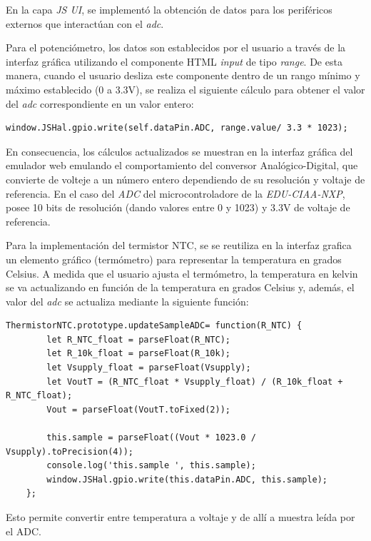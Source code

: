 En la capa \textit{JS UI}, se implementó la obtención de datos para los periféricos externos que interactúan con el \textit{adc}. 

Para el potenciómetro, los datos son establecidos por el usuario a través de la interfaz gráfica utilizando el componente HTML  \textit{input} de tipo \textit{range}. De esta manera, cuando el usuario desliza este componente dentro de un rango mínimo y máximo establecido (0 a 3.3V), se realiza el siguiente cálculo para obtener el valor del \textit{adc} correspondiente en un valor entero:

\begin{lstlisting}[caption={Cálculo del ADC para el potenciómetro.}]
  window.JSHal.gpio.write(self.dataPin.ADC, range.value/ 3.3 * 1023);
\end{lstlisting}

En consecuencia, los cálculos actualizados se muestran en la interfaz gráfica del emulador web emulando el comportamiento del conversor Analógico-Digital, que convierte de volteje a un número entero dependiendo de su resolución y voltaje de referencia. En el caso del \textit{ADC} del microcontroladore de la \textit{EDU-CIAA-NXP}, posee 10 bits de resolución (dando valores entre 0 y 1023) y 3.3V de voltaje de referencia.

Para la implementación del termistor NTC, se se reutiliza en la interfaz grafica un elemento gráfico (termómetro) para representar la temperatura en grados Celsius. A medida que el usuario ajusta el termómetro, la temperatura en kelvin se va actualizando en función de la temperatura en grados Celsius y, además, el valor del \textit{adc} se actualiza mediante la siguiente función:

\begin{lstlisting}[caption={Cálculo ADC del termistor NTC.}]
     ThermistorNTC.prototype.updateSampleADC= function(R_NTC) {
        let R_NTC_float = parseFloat(R_NTC);
        let R_10k_float = parseFloat(R_10k);
        let Vsupply_float = parseFloat(Vsupply);    
        let VoutT = (R_NTC_float * Vsupply_float) / (R_10k_float + R_NTC_float);
        Vout = parseFloat(VoutT.toFixed(2)); 

        this.sample = parseFloat((Vout * 1023.0 / Vsupply).toPrecision(4));
        console.log('this.sample ', this.sample);
        window.JSHal.gpio.write(this.dataPin.ADC, this.sample);     
    };
\end{lstlisting}

Esto permite convertir entre temperatura a voltaje y de allí a muestra leída por el ADC.

